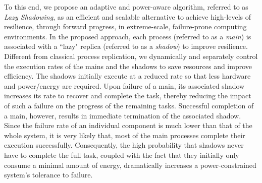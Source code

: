 To this end, we propose an adaptive and power-aware algorithm, referred to as \textit{Lazy
Shadowing}, as an efficient and scalable alternative to achieve high-levels of resilience, through
forward progress, in extreme-scale, failure-prone computing environments. In the proposed
approach, each process (referred to as a \textit{main}) is associated with a ``lazy" replica (referred to as a \textit{shadow}) to improve resilience. %
Different from classical process replication, we dynamically and separately control the execution rates
of the mains and the shadows to save resources and improve efficiency.
The shadows initially execute at a reduced rate so that less hardware and power/energy are required.
Upon failure of a main, its associated shadow increases its rate to recover and complete the task, thereby reducing the impact of such a failure on the progress of
the remaining tasks. Successful completion of a main, however, results in immediate
termination of the associated shadow. Since the failure rate of an individual component is much lower than that of 
the whole system, it is very likely that, most of the main processes complete their execution
successfully. %
Consequently, the high probability that shadows never have to complete the full task, coupled with the fact that 
they initially only consume a minimal amount of energy, 
dramatically increases a power-constrained system's tolerance to failure.


